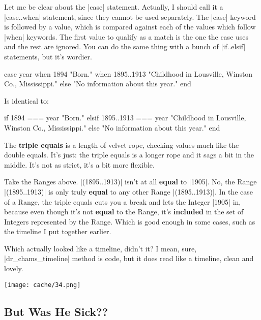 \documentclass[12pt,twoside]{report}
\begin{document}
Let me be clear about the \rubyinline|case| statement.
Actually, I should call it a \rubyinline|case..when|
statement, since they cannot be used separately.  The
\rubyinline|case| keyword is followed by a value,
which is compared against each of the values which follow
\rubyinline|when| keywords.  The first value to
qualify as a match is the one the case uses and the rest are ignored.
You can do the same thing with a bunch of
\rubyinline|if..elsif| statements, but it's wordier.


\begin{rubycode}

 case year
 when 1894
   "Born."
 when 1895..1913
   "Childhood in Lousville, Winston Co., Mississippi."
 else
   "No information about this year."
 end

\end{rubycode}


Is identical to:


\begin{rubycode}

 if 1894 === year
   "Born."
 elsif 1895..1913 === year
   "Childhood in Lousville, Winston Co., Mississippi."
 else
   "No information about this year."
 end

\end{rubycode}


The {\bf triple equals} is a length of velvet rope, checking values
much like the double equals.  It's just: the triple equals is a longer
rope and it sags a bit in the middle.  It's not as strict, it's a bit
more flexible.

Take the Ranges above.  \rubyinline|(1895..1913)|
isn't at all {\bf equal} to \rubyinline|1905|.  No,
the Range \rubyinline|(1895..1913)| is only truly {\bf
  equal} to any other Range \rubyinline|(1895..1913)|.
In the case of a Range, the triple equals cuts you a break and lets
the Integer \rubyinline|1905| in, because even though
it's not {\bf equal} to the Range, it's {\bf included} in the set of
Integers represented by the Range.  Which is good enough in some
cases, such as the timeline I put together earlier.

Which actually looked like a timeline, didn't it?  I mean, sure,
\rubyinline|dr_chams_timeline| method is code, but it
does read like a timeline, clean and lovely.

\newpage

	\texttt{[image: cache/34.png]}


\subsection{But Was He Sick??}
\end{document}
